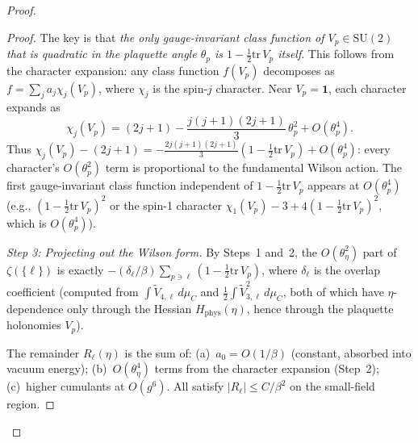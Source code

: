 \documentclass[11pt]{article}
\theoremstyle{definition}
\newcommand{\SU}{\mathrm{SU}}
\newcommand{\tr}{\mathrm{tr}}
\begin{document}
\begin{proof}
\begin{proof}
The key is that \emph{the only gauge-invariant class function
of $V_p\in\SU(2)$ that is quadratic in the plaquette angle
$\theta_p$ is $1-\frac{1}{2}\tr\,V_p$ itself}.  This follows
from the character expansion: any class function $f(V_p)$
decomposes as $f=\sum_j a_j\chi_j(V_p)$, where
$\chi_j$ is the spin-$j$ character.  Near
$V_p=\mathbf{1}$, each character expands as
\begin{equation}\label{eq:character-expansion}
\chi_j(V_p)=(2j+1)-\frac{j(j+1)(2j+1)}{3}\,\theta_p^2
+O(\theta_p^4).
\end{equation}
Thus $\chi_j(V_p)-(2j+1)=-\frac{2j(j+1)(2j+1)}{3}
(1-\frac{1}{2}\tr\,V_p)+O(\theta_p^4)$:
every character's $O(\theta_p^2)$ term is proportional to
the fundamental Wilson action.  The first gauge-invariant class
function independent of $1-\frac{1}{2}\tr\,V_p$ appears at
$O(\theta_p^4)$ (e.g.,
$(1-\frac{1}{2}\tr\,V_p)^2$ or the spin-1 character
$\chi_1(V_p)-3+4(1-\frac{1}{2}\tr\,V_p)^2$, which is
$O(\theta_p^4)$).

\emph{Step 3: Projecting out the Wilson form.}
By Steps~1 and~2, the $O(\theta_\eta^2)$ part of
$\zeta(\{\ell\})$ is exactly
$-(\delta_\ell/\beta)\sum_{p\ni\ell}(1-\frac{1}{2}\tr\,V_p)$,
where $\delta_\ell$ is the overlap coefficient (computed from
$\int\widetilde{V}_{4,\ell}\,d\mu_C$ and
$\frac{1}{2}\int\widetilde{V}_{3,\ell}^2\,d\mu_C$,
both of which have $\eta$-dependence only through the
Hessian $H_{\mathrm{phys}}(\eta)$, hence through the plaquette
holonomies $V_p$).

The remainder $R_\ell(\eta)$ is the sum of:
(a)~$a_0=O(1/\beta)$ (constant, absorbed into vacuum energy);
(b)~$O(\theta_\eta^4)$ terms from the character expansion
(Step~2); (c)~higher cumulants at $O(g^6)$.  All satisfy
$|R_\ell|\le C/\beta^2$ on the small-field region.
\end{proof}


\end{proof}
\end{document}
